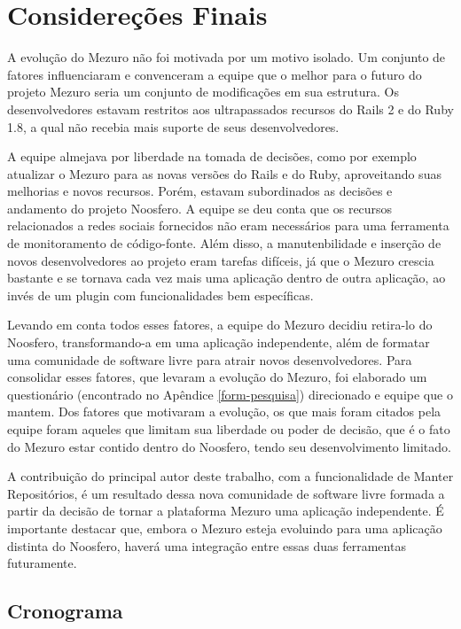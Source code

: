 \chapter{Considereções Finais}

A evolução do Mezuro não foi motivada por um motivo isolado. Um conjunto de fatores influenciaram e convenceram a equipe que o melhor para o futuro do projeto Mezuro seria um conjunto de modificações em sua estrutura. Os desenvolvedores estavam restritos aos ultrapassados recursos do Rails 2 e do Ruby 1.8, a qual não recebia mais suporte de seus desenvolvedores.

A equipe almejava por liberdade na tomada de decisões, como por exemplo atualizar o Mezuro para as novas versões do Rails e do Ruby, aproveitando suas melhorias e novos recursos. Porém, estavam subordinados as decisões e andamento do projeto Noosfero. A equipe se deu conta que os recursos relacionados a redes sociais fornecidos não eram necessários para uma ferramenta de monitoramento de código-fonte. Além disso, a manutenbilidade e inserção de novos desenvolvedores ao projeto eram tarefas difíceis, já que o Mezuro crescia bastante e se tornava cada vez mais uma aplicação dentro de outra aplicação, ao invés de um plugin com funcionalidades bem específicas.

Levando em conta todos esses fatores, a equipe do Mezuro decidiu retira-lo do Noosfero, transformando-a em uma aplicação independente, além de formatar uma comunidade de software livre para atrair novos desenvolvedores. Para consolidar esses fatores, que levaram a evolução do Mezuro, foi elaborado um questionário (encontrado no Apêndice \ref{form-pesquisa}) direcionado e equipe que o mantem. Dos fatores que motivaram a evolução, os que mais foram citados pela equipe foram aqueles que limitam sua liberdade ou poder de decisão, que é o fato do Mezuro estar contido dentro do Noosfero, tendo seu desenvolvimento limitado.

A contribuição do principal autor deste trabalho, com a funcionalidade de Manter Repositórios, é um resultado dessa nova comunidade de software livre formada a partir da decisão de tornar a plataforma Mezuro uma aplicação independente. É importante destacar que, embora o Mezuro esteja evoluindo para uma aplicação distinta do Noosfero, haverá uma integração entre essas duas ferramentas futuramente.

\section{Cronograma}

